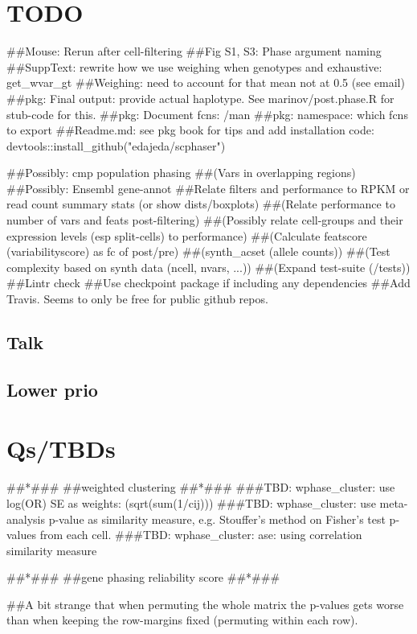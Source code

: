 



\section{TODO}
##Mouse: Rerun after cell-filtering
##Fig S1, S3: Phase argument naming
##SuppText: rewrite how we use weighing when genotypes and exhaustive: get_wvar_gt
##Weighing: need to account for that mean not at 0.5 (see email)
##pkg: Final output: provide actual haplotype. See marinov/post.phase.R for stub-code for this.
##pkg: Document fcns: /man
##pkg: namespace: which fcns to export
##Readme.md: see pkg book for tips and add installation code: devtools::install_github("edajeda/scphaser")

##Possibly: cmp population phasing
##(Vars in overlapping regions)
##Possibly: Ensembl gene-annot
##Relate filters and performance to RPKM or read count summary stats (or show dists/boxplots)
##(Relate performance to number of vars and feats post-filtering)
##(Possibly relate cell-groups and their expression levels (esp split-cells) to performance)
##(Calculate featscore (variabilityscore) as fc of post/pre)
##(synth_acset (allele counts))
##(Test complexity based on synth data (ncell, nvars, ...))
##(Expand test-suite (/tests))
##Lintr check
##Use checkpoint package if including any dependencies
##Add Travis. Seems to only be free for public github repos.

\subsection{Talk}

\subsection{Lower prio}

\section{Qs/TBDs}

##*###
##weighted clustering
##*###
###TBD: wphase_cluster: use log(OR) SE as weights: (sqrt(sum(1/cij)))
###TBD: wphase_cluster: use meta-analysis p-value as similarity measure, e.g. Stouffer's method on Fisher's test p-values from each cell.
###TBD: wphase_cluster: ase: using correlation similarity measure

##*###
##gene phasing reliability score
##*###

##A bit strange that when permuting the whole matrix the p-values gets worse than when keeping the row-margins fixed (permuting within each row).

